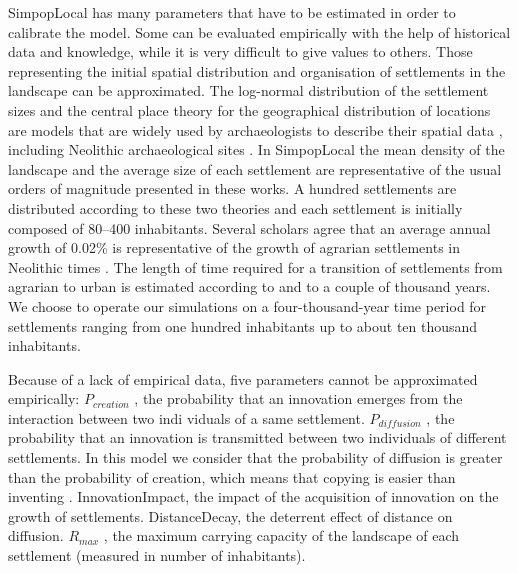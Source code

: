 SimpopLocal has many parameters that have to be estimated in order to calibrate the model. Some can be evaluated empirically with the help of historical data and knowledge, while it is very difficult to give values to others. Those representing the initial spatial distribution and organisation of settlements in the landscape can be approximated. The log-normal distribution of the settlement sizes and the central place theory \autocite{Christaller1933} for the geographical distribution of locations are models that are widely used by archaeologists to describe their spatial data \autocites{Archaeomedes1998, Johnson1977, Sanders2012}, including Neolithic archaeological sites \autocite{Liu1996}. In SimpopLocal the mean density of the landscape and the average size of each settlement are representative of the usual orders of magnitude presented in these works. A hundred settlements are distributed according to these two theories and each settlement is initially composed of 80–400 inhabitants. Several scholars agree that an average annual growth of 0.02\% is representative of the growth of agrarian settlements in Neolithic times \autocites{Bairoch1985,Renfrew1979}. The length of time required for a transition of settlements from agrarian to urban is estimated according to \textcite{Bairoch1985} and \textcite{Marcus2008} to a couple of thousand years. We choose to operate our simulations on a four-thousand-year time period for settlements ranging from one hundred inhabitants up to about ten thousand inhabitants.

Because of a lack of empirical data, five parameters cannot be approximated empirically: $P_{creation}$ , the probability that an innovation emerges from the interaction between two indi­ viduals of a same settlement. $P_{diffusion}$ , the probability that an innovation is transmitted between two individuals of different settlements. In this model we consider that the probability of diffusion is greater than the probability of creation, which means that copying is easier than inventing \autocite{Pennisi2010}. InnovationImpact, the impact of the acquisition of innovation on the growth of settlements. DistanceDecay, the deterrent effect of distance on diffusion. $R_{max}$ , the maximum carrying capacity of the landscape of each settlement (measured in number of inhabitants).

